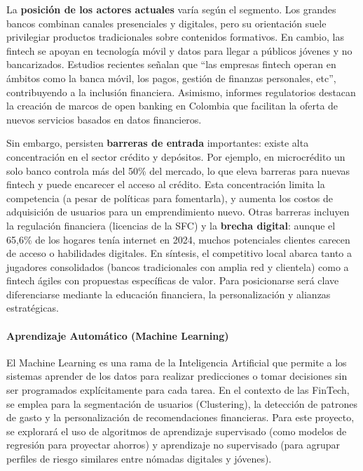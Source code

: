 La \textbf{posición de los actores actuales} varía según el segmento. Los grandes bancos combinan canales presenciales y digitales, pero su orientación suele privilegiar productos tradicionales sobre contenidos formativos. En cambio, las fintech se apoyan en tecnología móvil y datos para llegar a públicos jóvenes y no bancarizados. Estudios recientes señalan que “las empresas fintech operan en ámbitos como la banca móvil, los pagos, gestión de finanzas personales, etc”, contribuyendo a la inclusión financiera. Asimismo, informes regulatorios destacan la creación de marcos de open banking en Colombia que facilitan la oferta de nuevos servicios basados en datos financieros. 

Sin embargo, persisten \textbf{barreras de entrada} importantes: existe alta concentración en el sector crédito y depósitos. Por ejemplo, en microcrédito un solo banco controla más del 50\% del mercado, lo que eleva barreras para nuevas fintech y puede encarecer el acceso al crédito. Esta concentración limita la competencia (a pesar de políticas para fomentarla), y aumenta los costos de adquisición de usuarios para un emprendimiento nuevo. Otras barreras incluyen la regulación financiera (licencias de la SFC) y la \textbf{brecha digital}: aunque el 65,6\% de los hogares tenía internet en 2024, muchos potenciales clientes carecen de acceso o habilidades digitales. En síntesis, el competitivo local abarca tanto a jugadores consolidados (bancos tradicionales con amplia red y clientela) como a fintech ágiles con propuestas específicas de valor. Para posicionarse será clave diferenciarse mediante la educación financiera, la personalización y alianzas estratégicas.

\paragraph*{Aprendizaje Automático (Machine Learning)}
El Machine Learning es una rama de la Inteligencia Artificial que permite a los sistemas aprender de los datos para realizar predicciones o tomar decisiones sin ser programados explícitamente para cada tarea. En el contexto de las FinTech, se emplea para la segmentación de usuarios (Clustering), la detección de patrones de gasto y la personalización de recomendaciones financieras. Para este proyecto, se explorará el uso de algoritmos de aprendizaje supervisado (como modelos de regresión para proyectar ahorros) y aprendizaje no supervisado (para agrupar perfiles de riesgo similares entre nómadas digitales y jóvenes).